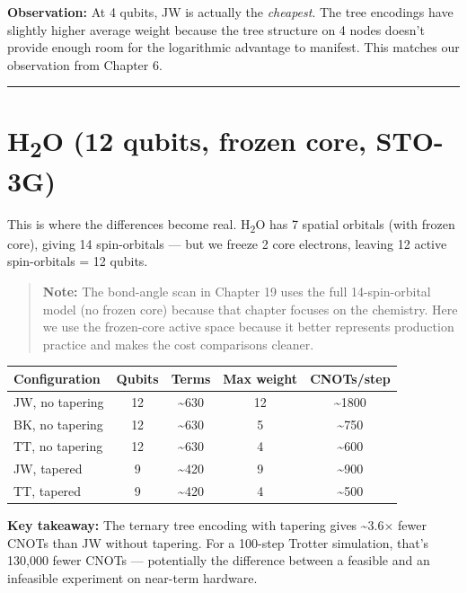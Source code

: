 \documentclass[
  11pt,
  oneside]{book}
\begin{document}
\textbf{Observation:} At 4 qubits, JW is actually the \emph{cheapest}.
The tree encodings have slightly higher average weight because the tree
structure on 4 nodes doesn't provide enough room for the logarithmic
advantage to manifest. This matches our observation from Chapter 6.

\begin{center}\rule{0.5\linewidth}{0.5pt}\end{center}

\section{H\textsubscript{2}O (12 qubits, frozen core,
STO-3G)}\label{hux2082o-12-qubits-frozen-core-sto-3g}

This is where the differences become real. H\textsubscript{2}O has 7 spatial orbitals
(with frozen core), giving 14 spin-orbitals --- but we freeze 2 core
electrons, leaving 12 active spin-orbitals = 12 qubits.

\begin{quote}
\textbf{Note:} The bond-angle scan in Chapter 19 uses the full
14-spin-orbital model (no frozen core) because that chapter focuses on
the chemistry. Here we use the frozen-core active space because it
better represents production practice and makes the cost comparisons
cleaner.
\end{quote}

\begin{longtable}[]{@{}lcccc@{}}
\toprule\noalign{}
Configuration & Qubits & Terms & Max weight & CNOTs/step \\
\midrule\noalign{}
\endhead
\bottomrule\noalign{}
\endlastfoot
JW, no tapering & 12 & \textasciitilde630 & 12 & \textasciitilde1800 \\
BK, no tapering & 12 & \textasciitilde630 & 5 & \textasciitilde750 \\
TT, no tapering & 12 & \textasciitilde630 & 4 & \textasciitilde600 \\
JW, tapered & 9 & \textasciitilde420 & 9 & \textasciitilde900 \\
TT, tapered & 9 & \textasciitilde420 & 4 & \textasciitilde500 \\
\end{longtable}

\textbf{Key takeaway:} The ternary tree encoding with tapering gives
\textasciitilde3.6$\times$ fewer CNOTs than JW without tapering. For a 100-step
Trotter simulation, that's 130,000 fewer CNOTs --- potentially the
difference between a feasible and an infeasible experiment on near-term
hardware.
\end{document}
